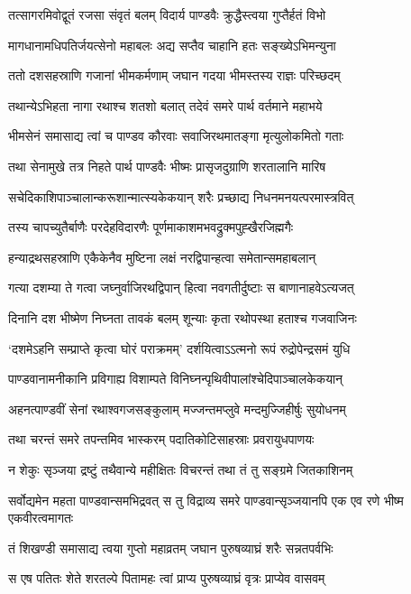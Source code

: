 \twolineshloka
{तत्सागरमिवोद्वूतं रजसा संवृतं बलम्}
{विदार्य पाण्डवैः क्रुद्धैस्त्वया गुप्तैर्हतं विभो}


\twolineshloka
{मागधानामधिपतिर्जयत्सेनो महाबलः}
{अद्य सप्तैव चाहानि हतः सङ्ख्येऽभिमन्युना}


\twolineshloka
{ततो दशसहस्राणि गजानां भीमकर्मणाम्}
{जघान गदया भीमस्तस्य राज्ञः परिच्छदम्}


\twolineshloka
{तथान्येऽभिहता नागा रथाश्च शतशो बलात्}
{तदेवं समरे पार्थ वर्तमाने महाभये}


\twolineshloka
{भीमसेनं समासाद्य त्वां च पाण्डव कौरवाः}
{सवाजिरथमातङ्गा मृत्युलोकमितो गताः}


\twolineshloka
{तथा सेनामुखे तत्र निहते पार्थ पाण्डवैः}
{भीष्मः प्रासृजदुग्राणि शरतालानि मारिष}


\twolineshloka
{सचेदिकाशिपाञ्चालान्करूशान्मात्स्यकेकयान्}
{शरैः प्रच्छाद्य निधनमनयत्परमास्त्रवित्}


\twolineshloka
{तस्य चापच्युतैर्बाणैः परदेहविदारणैः}
{पूर्णमाकाशमभवद्रुक्मपुह्खैरजिह्मगैः}


\twolineshloka
{हन्याद्रथसहस्राणि एकैकेनैव मुष्टिना}
{लक्षं नरद्विपान्हत्वा समेतान्समहाबलान्}


\twolineshloka
{गत्या दशम्या ते गत्वा जघ्नुर्वाजिरथद्विपान्}
{हित्वा नवगतीर्दुष्टाः स बाणानाहवेऽत्यजत्}


\twolineshloka
{दिनानि दश भीष्मेण निघ्नता तावकं बलम्}
{शून्याः कृता रथोपस्था हताश्च गजवाजिनः}


\twolineshloka
{`दशमेऽहनि सम्प्राप्ते कृत्वा घोरं पराक्रमम्'}
{दर्शयित्वाऽऽत्मनो रूपं रुद्रोपेन्द्रसमं युधि}


\twolineshloka
{पाण्डवानामनीकानि प्रविगाह्य विशाम्पते}
{विनिघ्नन्पृथिवीपालांश्चेदिपाञ्चालकेकयान्}


\twolineshloka
{अहनत्पाण्डवीं सेनां रथाश्वगजसङ्कुलाम्}
{मज्जन्तमप्लुवे मन्दमुज्जिहीर्षुः सुयोधनम्}


\twolineshloka
{तथा चरन्तं समरे तपन्तमिव भास्करम्}
{पदातिकोटिसाहस्राः प्रवरायुधपाणयः}


\twolineshloka
{न शेकुः सृञ्जया द्रष्टुं तथैवान्ये महीक्षितः}
{विचरन्तं तथा तं तु सङ्ग्रमे जितकाशिनम्}


\threelineshloka
{सर्वोद्यमेन महता पाण्डवान्समभिद्रवत्}
{स तु विद्राव्य समरे पाण्डवान्सृञ्जयानपि}
{एक एव रणे भीष्म एकवीरत्वमागतः}


\twolineshloka
{तं शिखण्डी समासाद्य त्वया गुप्तो महाव्रतम्}
{जघान पुरुषव्याघ्रं शरैः सन्नतपर्वभिः}


\twolineshloka
{स एष पतितः शेते शरतल्पे पितामहः}
{त्वां प्राप्य पुरुषव्याघ्रं वृत्रः प्राप्येव वासवम्}


